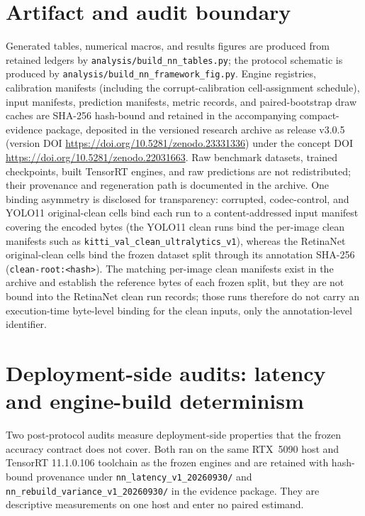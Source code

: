 \documentclass[10pt]{article}
\begin{document}
\section{Artifact and audit boundary}

Generated tables, numerical macros, and results figures are produced from
retained ledgers by \texttt{analysis/build\_nn\_}\allowbreak\texttt{tables.py}; the protocol
schematic is produced by \texttt{analysis/build\_nn\_framework\_fig.py}. Engine registries,
calibration manifests (including the corrupt-calibration cell-assignment
schedule), input manifests, prediction manifests, metric records, and paired-bootstrap
draw caches are SHA-256 hash-bound and retained in the accompanying
compact-evidence package, deposited in the versioned research archive
as release v3.0.5 (version DOI \url{https://doi.org/10.5281/zenodo.23331336}) under the
concept DOI \url{https://doi.org/10.5281/zenodo.22031663}. Raw
benchmark datasets, trained checkpoints, built TensorRT engines, and raw
predictions are not redistributed; their provenance and regeneration path is
documented in the archive. One binding asymmetry is disclosed for
transparency: corrupted, codec-control, and YOLO11 original-clean cells bind
each run to a content-addressed input manifest covering the encoded bytes
(the YOLO11 clean runs bind the per-image clean manifests such as
\texttt{kitti\_val\_clean\_ultralytics\_v1}), whereas the RetinaNet
original-clean cells bind the frozen dataset split through its annotation
SHA-256 (\texttt{clean-root:<hash>}). The matching per-image clean manifests
exist in the archive and establish the reference bytes of each frozen split,
but they are not bound into the RetinaNet clean run records; those runs
therefore do not carry an execution-time byte-level binding for the clean
inputs, only the annotation-level identifier.

\section{Deployment-side audits: latency and engine-build determinism}
\label{sec:deploy-audit}

Two post-protocol audits measure deployment-side properties that the frozen
accuracy contract does not cover. Both ran on the same RTX~5090 host and
TensorRT 11.1.0.106 toolchain as the frozen engines and are retained with
hash-bound provenance under
\texttt{nn\_latency\_v1\_20260930/} and
\texttt{nn\_rebuild\_variance\_v1\_20260930/} in the evidence package. They are
descriptive measurements on one host and enter no paired estimand.
\end{document}
